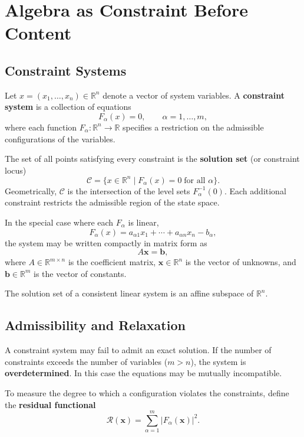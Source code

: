 \documentclass[11pt, openany]{book}
\theoremstyle{plain}
\theoremstyle{definition}
\theoremstyle{remark}
\begin{document}
\appendix

\chapter{Algebra as Constraint Before Content}

\section{Constraint Systems}

Let $x=(x_1,\dots,x_n)\in\mathbb{R}^n$ denote a vector of system variables.
A \textbf{constraint system} is a collection of equations
\[
F_\alpha(x)=0,\qquad \alpha=1,\dots,m,
\]
where each function $F_\alpha:\mathbb{R}^n\to\mathbb{R}$ specifies a
restriction on the admissible configurations of the variables.

The set of all points satisfying every constraint is the
\textbf{solution set} (or constraint locus)
\[
\mathcal{C}=\{x\in\mathbb{R}^n \mid F_\alpha(x)=0\;\text{for all }\alpha\}.
\]
Geometrically, $\mathcal{C}$ is the intersection of the level sets
$F_\alpha^{-1}(0)$. Each additional constraint restricts the admissible
region of the state space.

\medskip

In the special case where each $F_\alpha$ is linear,
\[
F_\alpha(x)=a_{\alpha1}x_1+\cdots+a_{\alpha n}x_n-b_\alpha,
\]
the system may be written compactly in matrix form as
\[
A\mathbf{x}=\mathbf{b},
\]
where $A\in\mathbb{R}^{m\times n}$ is the coefficient matrix,
$\mathbf{x}\in\mathbb{R}^n$ is the vector of unknowns, and
$\mathbf{b}\in\mathbb{R}^m$ is the vector of constants.

The solution set of a consistent linear system is an affine subspace of
$\mathbb{R}^n$.

\section{Admissibility and Relaxation}

A constraint system may fail to admit an exact solution.
If the number of constraints exceeds the number of variables ($m>n$),
the system is \textbf{overdetermined}. In this case the equations may be
mutually incompatible.

To measure the degree to which a configuration violates the constraints,
define the \textbf{residual functional}
\[
\mathcal{R}(\mathbf{x})
=\sum_{\alpha=1}^{m}\bigl|F_\alpha(\mathbf{x})\bigr|^{2}.
\]
\end{document}
